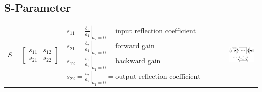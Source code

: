 \subsection{S-Parameter }
\begin{tabular}{lll}
        $S = \begin{bmatrix} s_{11} & s_{12} \\ s_{21} & s_{22} 
         \end{bmatrix}$
    & \parbox{8cm}{
        $s_{11} = \left . \frac{ b_1}{ a_1} \right|_{ a_2=0} 
                         = \text{input reflection coefficient}$ \\
        $s_{21} = \left . \frac{ b_2}{ a_1} \right|_{ a_2=0} 
                         = \text{forward gain}$ \\
        $s_{12} = \left . \frac{ b_1}{ a_2} \right|_{ a_1=0} 
                         = \text{backward gain}$ \\
        $s_{22} = \left . \frac{ b_2}{ a_2} \right|_{ a_1=0} 
                         = \text{output reflection coefficient}$ \\ \\
        }
    & \parbox{7cm}{
        \includegraphics[width=6.5cm]{./bilder/rfdesign_s-parameter.png}
        }\\
\end{tabular}

